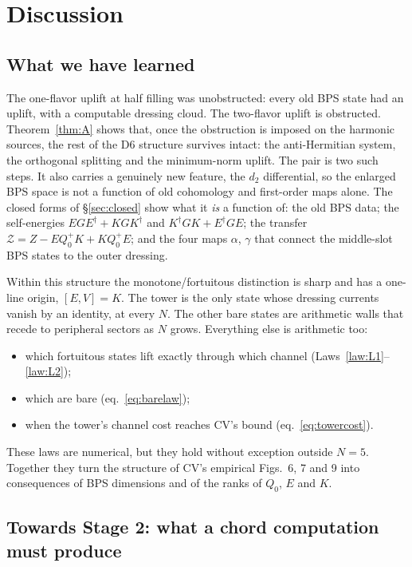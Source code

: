 \documentclass[11pt]{article}
\newcommand{\Zc}{\mathcal Z}
\theoremstyle{plain}
\theoremstyle{remark}
\numberwithin{equation}{section}
\begin{document}
\section{Discussion}\label{sec:discussion}

\subsection{What we have learned}

The one-flavor uplift at half filling was unobstructed: every old BPS state had an uplift, with a computable dressing
cloud. The two-flavor uplift is obstructed. Theorem~\ref{thm:A} shows that, once the obstruction is imposed on the
harmonic sources, the rest of the D6 structure survives intact: the anti-Hermitian system, the orthogonal splitting and
the minimum-norm uplift. The pair is two such steps. It also carries a genuinely new feature, the $d_2$ differential, so
the enlarged BPS space is not a function of old cohomology and first-order maps alone. The closed forms of
\S\ref{sec:closed} show what it \emph{is} a function of: the old BPS data; the self-energies $EGE^\dagger+KGK^\dagger$ and
$K^\dagger GK+E^\dagger GE$; the transfer $\Zc=Z-EQ_0^+K+KQ_0^+E$; and the four maps $\alpha$, $\gamma$ that connect the
middle-slot BPS states to the outer dressing.

Within this structure the monotone/fortuitous distinction is sharp and has a one-line origin, $[E,V]=K$. The tower is
the only state whose dressing currents vanish by an identity, at every $N$. The other bare states are arithmetic walls
that recede to peripheral sectors as $N$ grows. Everything else is arithmetic too:
\begin{itemize}\itemsep2pt
\item which fortuitous states lift exactly through which channel (Laws~\ref{law:L1}--\ref{law:L2});
\item which are bare (eq.~\eqref{eq:barelaw});
\item when the tower's channel cost reaches CV's bound (eq.~\eqref{eq:towercost}).
\end{itemize}
These laws are numerical, but they hold without exception outside $N=5$. Together they turn the structure of CV's
empirical Figs.~6, 7 and 9 into consequences of BPS dimensions and of the ranks of $Q_0$, $E$ and $K$.

\subsection{Towards Stage 2: what a chord computation must produce}
\end{document}
